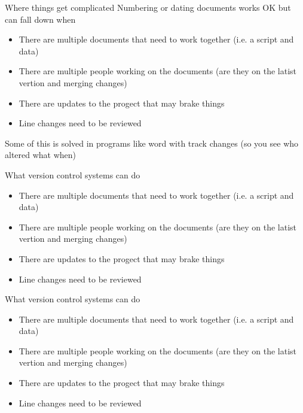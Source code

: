 \documentclass[10pt]{beamer}
\begin{document}
\begin{frame}[fragile]{Where things get complicated}
Numbering or dating documents works OK but can fall down when\\
	\begin{itemize}
		\item There are multiple documents that need to work together (i.e. a script and data)
		\item There are multiple people working on the documents (are they on the latist vertion and merging changes)
		\item There are updates to the progect that may brake things
		\item Line changes need to be reviewed
	\end{itemize}

Some of this is solved in programs like word with track changes (so you see who altered what when)
\end{frame}


\begin{frame}[fragile]{What version control systems can do}
	\begin{itemize}
		\item There are multiple documents that need to work together (i.e. a script and data)
		\item There are multiple people working on the documents (are they on the latist vertion and merging changes)
		\item There are updates to the progect that may brake things
		\item Line changes need to be reviewed
	\end{itemize}
\end{frame}

\begin{frame}[fragile]{What version control systems can do}
	\begin{itemize}
		\item There are multiple documents that need to work together (i.e. a script and data)
		\item There are multiple people working on the documents (are they on the latist vertion and merging changes)
		\item There are updates to the progect that may brake things
		\item Line changes need to be reviewed
	\end{itemize}
\end{frame}
\end{document}
